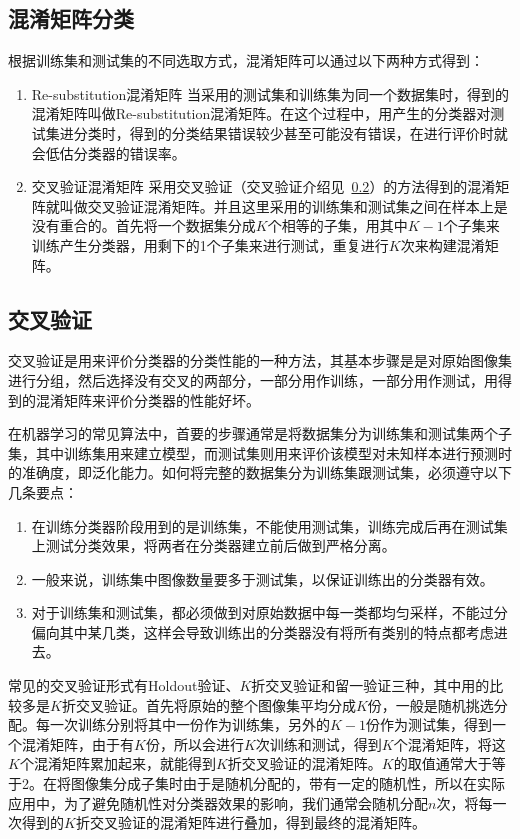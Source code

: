 \subsection{混淆矩阵分类}

根据训练集和测试集的不同选取方式，混淆矩阵可以通过以下两种方式得到：
\begin{enumerate}
\item Re-substitution混淆矩阵       
当采用的测试集和训练集为同一个数据集时，得到的混淆矩阵叫做Re-substitution混淆矩阵。在这个过程中，用产生的分类器对测试集进分类时，得到的分类结果错误较少甚至可能没有错误，在进行评价时就会低估分类器的错误率。
\item 交叉验证混淆矩阵
采用交叉验证（交叉验证介绍见~\ref{Cross Validation}）的方法得到的混淆矩阵就叫做交叉验证混淆矩阵。并且这里采用的训练集和测试集之间在样本上是没有重合的。首先将一个数据集分成$K$个相等的子集，用其中$K-1$个子集来训练产生分类器，用剩下的1个子集来进行测试，重复进行$K$次来构建混淆矩阵。
\end{enumerate}

\subsection{交叉验证}
\label{Cross Validation}
交叉验证是用来评价分类器的分类性能的一种方法，其基本步骤是是对原始图像集进行分组，然后选择没有交叉的两部分，一部分用作训练，一部分用作测试，用得到的混淆矩阵来评价分类器的性能好坏。

在机器学习的常见算法中，首要的步骤通常是将数据集分为训练集和测试集两个子集，其中训练集用来建立模型，而测试集则用来评价该模型对未知样本进行预测时的准确度，即泛化能力。如何将完整的数据集分为训练集跟测试集，必须遵守以下几条要点：
\begin{enumerate}
    \item 在训练分类器阶段用到的是训练集，不能使用测试集，训练完成后再在测试集上测试分类效果，将两者在分类器建立前后做到严格分离。
    \item 一般来说，训练集中图像数量要多于测试集，以保证训练出的分类器有效。
    \item 对于训练集和测试集，都必须做到对原始数据中每一类都均匀采样，不能过分偏向其中某几类，这样会导致训练出的分类器没有将所有类别的特点都考虑进去。
\end{enumerate}

常见的交叉验证形式有Holdout验证、$K$折交叉验证和留一验证三种，其中用的比较多是$K$折交叉验证。首先将原始的整个图像集平均分成$K$份，一般是随机挑选分配。每一次训练分别将其中一份作为训练集，另外的$K-1$份作为测试集，得到一个混淆矩阵，由于有$K$份，所以会进行$K$次训练和测试，得到$K$个混淆矩阵，将这$K$个混淆矩阵累加起来，就能得到$K$折交叉验证的混淆矩阵。$K$的取值通常大于等于2。在将图像集分成子集时由于是随机分配的，带有一定的随机性，所以在实际应用中，为了避免随机性对分类器效果的影响，我们通常会随机分配$n$次，将每一次得到的$K$折交叉验证的混淆矩阵进行叠加，得到最终的混淆矩阵。

